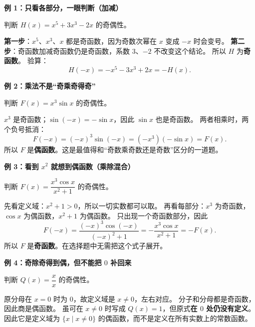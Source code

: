 \clearpage
\begin{examplebox}
\textbf{\textcolor{CExample}{例 1：只看各部分，一眼判断（加减）}}



判断 $H(x)=x^5+3x^3-2x$ 的奇偶性。

\textbf{第一步}：$x^5$、$x^3$、$x$ 都是奇函数，因为奇数次幂在 $x$ 变成 $-x$ 时会变号。
\textbf{第二步}：奇函数加减奇函数仍是奇函数，系数 $3$、$-2$ 不改变这个结论。
所以 $H$ 为\textbf{奇函数}。
验算：
\[
H(-x)=-x^5-3x^3+2x=-H(x).
\]

\medskip

\end{examplebox}
\clearpage
\begin{examplebox}
\textbf{\textcolor{CExample}{例 2：乘法不是“奇乘奇得奇”}}



判断 $F(x)=x^3\sin x$ 的奇偶性。

$x^3$ 是奇函数；$\sin(-x)=-\sin x$，因此 $\sin x$ 也是奇函数。
两者相乘时，两个负号抵消：
\[
F(-x)=(-x)^3\sin(-x)=(-x^3)(-\sin x)=F(x).
\]
所以 $F$ 是\textbf{偶函数}。这是最值得和“奇数乘奇数还是奇数”区分的一道题。

\medskip

\end{examplebox}
\clearpage
\begin{examplebox}
\textbf{\textcolor{CExample}{例 3：看到 $x^2$ 就想到偶函数（乘除混合）}}



判断 $F(x)=\dfrac{x^3\cos x}{x^2+1}$ 的奇偶性。

先看定义域：$x^2+1>0$，所以一切实数都可以取。
再看每部分：$x^3$ 为奇函数，$\cos x$ 为偶函数，$x^2+1$ 为偶函数。
只出现一个奇函数部分，因此
\[
F(-x)=\frac{(-x)^3\cos(-x)}{(-x)^2+1}
=-\frac{x^3\cos x}{x^2+1}=-F(x).
\]
所以 $F$ 是\textbf{奇函数}。在选择题中无需把这个式子展开。

\medskip

\end{examplebox}
\clearpage
\begin{examplebox}
\textbf{\textcolor{CExample}{例 4：奇除奇得到偶，但不能把 $0$ 补回来}}



判断 $Q(x)=\dfrac{x}{x}$ 的奇偶性。

原分母在 $x=0$ 时为 $0$，故定义域是 $x\ne0$，左右对应。
分子和分母都是奇函数，因此商是偶函数。
虽可在 $x\ne0$ 时写成 $Q(x)=1$，但原式\textbf{在 $0$ 处仍没有定义}。
因此它是定义域为 $\{x\mid x\ne0\}$ 的偶函数，而不是定义在所有实数上的常数函数。

\medskip

\end{examplebox}
